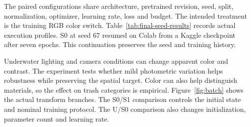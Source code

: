 The paired configurations share architecture, pretrained revision, seed, split, normalization, optimizer, learning rate, loss and budget. The intended treatment is the training RGB color switch. Table~\ref{tab:final-seed-results} records actual execution profiles. S0 at seed 67 resumed on Colab from a Kaggle checkpoint after seven epochs. This continuation preserves the seed and training history.

Underwater lighting and camera conditions can change apparent color and contrast. The experiment tests whether mild photometric variation helps robustness while preserving the spatial target. Color can also help distinguish materials, so the effect on trash categories is empirical. Figure~\ref{fig:batch} shows the actual transform branches. The S0/S1 comparison controls the initial state and nominal training protocol. The U/S0 comparison also changes initialization, parameter count and learning rate.

